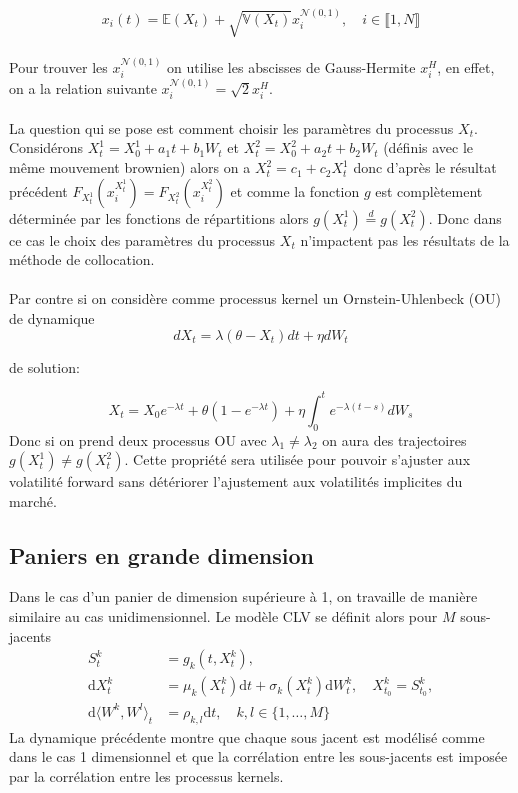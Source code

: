 \documentclass[a4paper,12pt]{report}
\numberwithin{equation}{section}
\theoremstyle{definition}
\numberwithin{equation}{section}
\begin{document}
\begin{equation}
\label{eq5}
x_{i}(t)=\mathbb{E}(X_t)+\sqrt{\mathbb{V}(X_t)}x_{i}^{\mathcal{N}(0,1)},\quad i\in\llbracket1,N\rrbracket
\end{equation}
\\
Pour trouver les $x_{i}^{\mathcal{N}(0,1)}$ on utilise les abscisses de Gauss-Hermite $x_{i}^{H}$, en effet, on a la relation suivante $x_{i}^{\mathcal{N}(0,1)}=\sqrt{2}x_{i}^{H}$.
\\\\
La question qui se pose est comment choisir les paramètres du processus $X_t$. Considérons $X_t^{1}=X_0^{1}+a_{1}t+b_{1}W_t$ et $X_t^{2}=X_0^{2}+a_{2}t+b_{2}W_t$ (définis avec le même mouvement brownien) alors on a $X_t^{2}=c_{1}+c_{2}X_t^{1}$ donc d'après le résultat précédent $F_{X_t^{1}}(x_{i}^{X_t^{1}})=F_{X_t^{2}}(x_{i}^{X_t^{2}})$ et comme la fonction $g$ est complètement déterminée par les fonctions de répartitions alors $g(X_t^{1})\overset{d}{=}g(X_t^{2})$. Donc dans ce cas le choix des paramètres du processus $X_t$ n'impactent pas les résultats de la méthode de collocation.
 \\\\Par contre si on considère comme processus kernel un Ornstein-Uhlenbeck (OU) de dynamique 
 \begin{equation}
 \label{eqOU}
 dX_t=\lambda(\theta-X_t)dt+\eta dW_t
 \end{equation}
 
de solution:

$$X_t=X_{0}e^{-\lambda t}+\theta(1-e^{-\lambda t})+\eta \int_0^t e^{-\lambda (t-s)}dW_s
$$
Donc si on prend deux processus OU avec $\lambda_{1}\neq\lambda_{2}$ on aura des trajectoires $g(X^{1}_t)\neq g(X^{2}_t)$. Cette propriété sera utilisée pour pouvoir s'ajuster aux volatilité forward sans détériorer l'ajustement aux volatilités implicites du marché. 
\subsection{Paniers en grande dimension}
Dans le cas d'un panier de dimension supérieure à 1, on travaille de manière similaire au cas unidimensionnel. Le modèle CLV se définit alors pour $M$ sous-jacents
\begin{equation*}
\begin{split}
S_t^k&= g_k(t, X_t^k),\\
\mbox{d}X_t^k&=\mu_k(X_t^k)\mbox{d}t+\sigma_k(X_t^k)\mbox{d}W_t^k,\quad X_{t_0}^k = S_{t_0}^k,\\
\mbox{d}\langle W^k, W^l\rangle_t&=\rho_{k,l}\mbox{d}t,\quad k,l\in \{1,\dots,M \}
\end{split}
\end{equation*}
La dynamique précédente montre que chaque sous jacent est modélisé comme dans le cas 1 dimensionnel et que la corrélation entre les sous-jacents est imposée par la corrélation entre les processus kernels.
\end{document}
